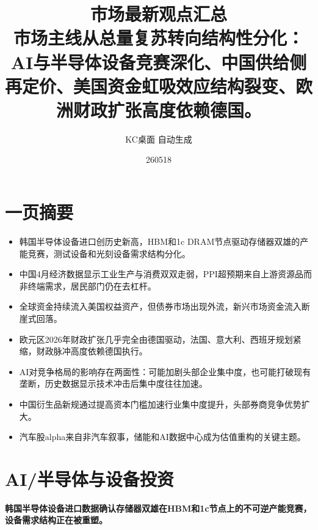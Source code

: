\documentclass[11pt]{ctexart}
\title{\textbf{市场最新观点汇总}\\[0.4em]{\large 市场主线从总量复苏转向结构性分化：AI与半导体设备竞赛深化、中国供给侧再定价、美国资金虹吸效应结构裂变、欧洲财政扩张高度依赖德国。}}
\author{KC桌面 自动生成}
\date{260518}
\begin{document}
\maketitle
\section*{一页摘要}
\begin{itemize}
  \item 韩国半导体设备进口创历史新高，HBM和1c DRAM节点驱动存储器双雄的产能竞赛，测试设备和光刻设备需求结构分化。
  \item 中国4月经济数据显示工业生产与消费双双走弱，PPI超预期来自上游资源品而非终端需求，居民部门仍在去杠杆。
  \item 全球资金持续流入美国权益资产，但债券市场出现外流，新兴市场资金流入断崖式回落。
  \item 欧元区2026年财政扩张几乎完全由德国驱动，法国、意大利、西班牙规划紧缩，财政脉冲高度依赖德国执行。
  \item AI对竞争格局的影响存在两面性：可能加剧头部企业集中度，也可能打破现有垄断，历史数据显示技术冲击后集中度往往加速。
  \item 中国衍生品新规通过提高资本门槛加速行业集中度提升，头部券商竞争优势扩大。
  \item 汽车股alpha来自非汽车叙事，储能和AI数据中心成为估值重构的关键主题。
\end{itemize}
\section{AI/半导体与设备投资}
\textbf{韩国半导体设备进口数据确认存储器双雄在HBM和1c节点上的不可逆产能竞赛，设备需求结构正在被重塑。}
\end{document}
